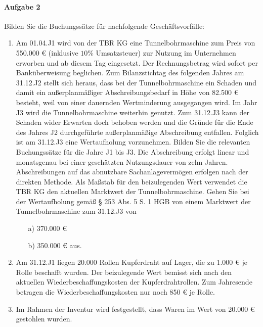 \documentclass[paper=a4, fontsize=11pt]{scrartcl}
\numberwithin{equation}{section}
\numberwithin{figure}{section}
\numberwithin{table}{section}
\begin{document}
\paragraph{Aufgabe 2}
Bilden Sie die Buchungssätze für nachfolgende Geschäftsvorfälle: \\
\begin{enumerate}
\item Am 01.04.J1 wird von der TBR KG eine Tunnelbohrmaschine zum Preis von 550.000 € (inklusive $10 \%$ Umsatzsteuer) zur Nutzung im Unternehmen erworben und ab diesem Tag eingesetzt. Der Rechnungsbetrag wird sofort per Banküberweisung beglichen.  Zum Bilanzstichtag des folgenden Jahres am 31.12.J2 stellt sich heraus, dass bei der Tunnelbohrmaschine ein Schaden und damit ein außerplanmäßiger Abschreibungsbedarf in Höhe von 82.500 € besteht, weil von einer dauernden Wertminderung ausgegangen wird.  Im Jahr J3 wird die Tunnelbohrmaschine weiterhin genutzt. Zum 31.12.J3 kann der Schaden wider Erwarten doch behoben werden und die Gründe für die Ende des Jahres J2 durchgeführte außerplanmäßige Abschreibung entfallen. Folglich ist am 31.12.J3 eine Wertaufholung vorzunehmen.  Bilden Sie die relevanten Buchungssätze für die Jahre J1 bis J3. Die Abschreibung erfolgt linear und monatsgenau bei einer geschätzten Nutzungsdauer von zehn Jahren. Abschreibungen auf das abnutzbare Sachanlagevermögen erfolgen nach der direkten Methode. Als Maßstab für den beizulegenden Wert verwendet die TBR KG den aktuellen Marktwert der Tunnelbohrmaschine. Gehen Sie bei der Wertaufholung gemäß § 253 Abs. 5 S. 1 HGB von einem Marktwert der Tunnelbohrmaschine zum 31.12.J3 von 
\begin{itemize}
\item[a)] 370.000 € 
\item[b)] 350.000 € aus. 
\end{itemize} 
\item Am 31.12.J1 liegen 20.000 Rollen Kupferdraht auf Lager, die zu 1.000 € je Rolle beschafft wurden. Der beizulegende Wert bemisst sich nach den aktuellen Wiederbeschaffungskosten der Kupferdrahtrollen. Zum Jahresende betragen die Wiederbeschaffungskosten nur noch 850 € je Rolle. 
\item Im Rahmen der Inventur wird festgestellt, dass Waren im Wert von 20.000 € gestohlen wurden.
\end{enumerate}
\end{document}
